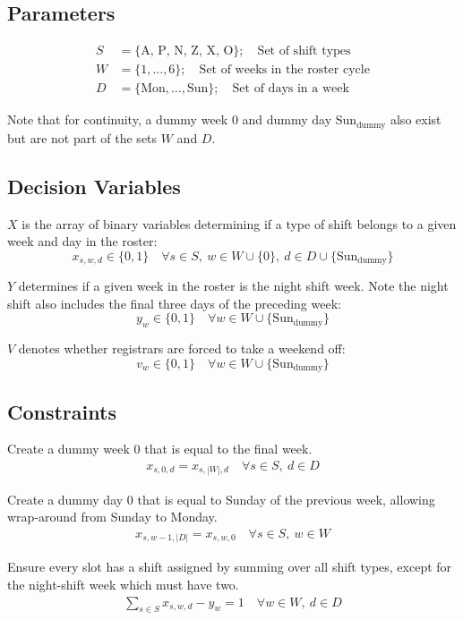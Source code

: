 \documentclass[a4paper]{article}
\begin{document}
\subsection{Parameters}

\begin{align*}
S &= \{\text{A, P, N, Z, X, O}\}; \quad\text{Set of shift types}\\
W &= \{1, \dots, 6\}; \quad\text{Set of weeks in the roster cycle}\\
D &= \{\text{Mon},\dots,\text{Sun}\}; \quad\text{Set of days in a week}
\end{align*}

Note that for continuity, a dummy week $0$ and dummy day $\text{Sun}_\text{dummy}$ also exist but are not part of the sets $W$ and $D$.

\subsection{Decision Variables}

$X$ is the array of binary variables determining if a type of shift belongs to a given week and day in the roster:
$$x_{s, w, d} \in \{0, 1\} \quad\forall s\in S,\  w\in W \cup \{0\},\  d\in D \cup \{\text{Sun}_\text{dummy}\}$$

$Y$ determines if a given week in the roster is the night shift week. Note the night shift also includes the final three days of the preceding week:
$$y_w \in \{0, 1\} \quad\forall w\in W \cup \{\text{Sun}_\text{dummy}\}$$

$V$ denotes whether registrars are forced to take a weekend off:
$$v_w \in \{0, 1\} \quad\forall w\in W \cup \{\text{Sun}_\text{dummy}\}$$

\subsection{Constraints}

Create a dummy week 0 that is equal to the final week.
\begin{align}
  x_{s, 0, d} = x_{s, |W|, d} \quad\forall s\in S,\ d\in D
\end{align}

Create a dummy day 0 that is equal to Sunday of the previous week, allowing wrap-around from Sunday to Monday.
\begin{align}
  x_{s, w-1, |D|} = x_{s, w, 0} \quad\forall s\in S,\ w\in W
\end{align}

Ensure every slot has a shift assigned by summing over all shift types, except for the night-shift week which must have two.
\begin{align}
  \sum_{s\in S} x_{s, w, d} - y_w = 1 \quad\forall w\in W,\ d\in D
\end{align}
\end{document}
